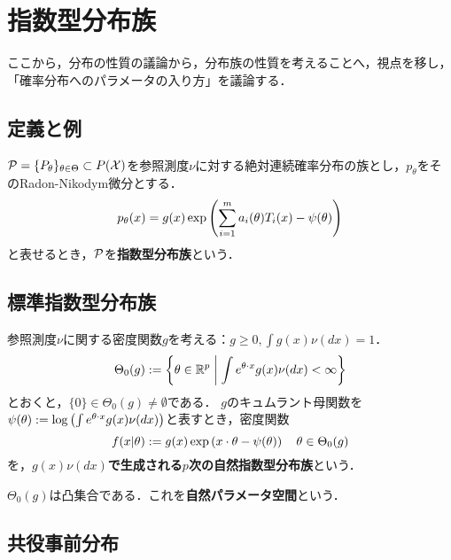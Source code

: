 \documentclass[uplatex,dvipdfmx]{jsreport}
\begin{document}
\section{指数型分布族}

\begin{tcolorbox}[colframe=ForestGreen, colback=ForestGreen!10!white,breakable,colbacktitle=ForestGreen!40!white,coltitle=black,fonttitle=\bfseries\sffamily,
title=]
    ここから，分布の性質の議論から，分布族の性質を考えることへ，視点を移し，「確率分布へのパラメータの入り方」を議論する．
\end{tcolorbox}

\subsection{定義と例}

\begin{definition}
    $\P=\{P_\theta\}_{\theta\in\Theta}\subset P(\X)$を参照測度$\nu$に対する絶対連続確率分布の族とし，$p_\theta$をそのRadon-Nikodym微分とする．
    \[p_\theta(x)=g(x)\exp\paren{\sum^m_{i=1}a_i(\theta)T_i(x)-\psi(\theta)}\]
    と表せるとき，$\P$を\textbf{指数型分布族}という．
\end{definition}

\subsection{標準指数型分布族}

\begin{definition}[密度関数による指数型分布族の生成]
    参照測度$\nu$に関する密度関数$g$を考える：$g\ge0,\int g(x)\nu(dx)=1$．
    \[\Theta_0(g):=\Brace{\theta\in\R^p\;\middle|\;\int e^{\theta\cdot x}g(x)\nu(dx)<\infty}\]
    とおくと，$\{0\}\in\Theta_0(g)\ne\emptyset$である．
    $g$のキュムラント母関数を$\psi(\theta):=\log\paren{\int e^{\theta\cdot x}g(x)\nu(dx)}$と表すとき，密度関数
    \[f(x|\theta):=g(x)\exp\paren{x\cdot\theta-\psi(\theta)}\quad\theta\in\Theta_0(g)\]
    を，\textbf{$g(x)\nu(dx)$で生成される$p$次の自然指数型分布族}という．
\end{definition}

\begin{lemma}
    $\Theta_0(g)$は凸集合である．これを\textbf{自然パラメータ空間}という．
\end{lemma}

\subsection{共役事前分布}
\end{document}
